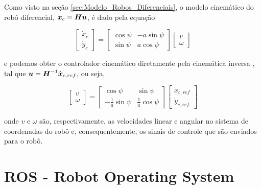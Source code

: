         Como visto na seção \ref{sec:Modelo_Robos_Diferenciais}, o modelo cinemático do robô diferencial, \( \boldsymbol{x}_c = \boldsymbol{H} \boldsymbol{u} \), é dado pela equação
        
        \begin{equation}
            \begin{bmatrix} \dot{x}_c \\ \dot{y}_c  \end{bmatrix} = \begin{bmatrix} \cos{\psi} & -a \sin{\psi} \\ \sin{\psi} & a \cos{\psi}   \end{bmatrix} \begin{bmatrix} v \\ \omega    \end{bmatrix}
            \label{eq:kinematics_differential_limo}
        \end{equation}
        
        e podemos obter o controlador cinemático diretamente pela cinemática inversa \cite{Sarcinelli-Filho2023_4}, tal que $\boldsymbol{u} = \boldsymbol{H}^{-1} \dot{\boldsymbol{x}}_{c,ref}$, ou seja,
        
        \begin{equation}
           \begin{bmatrix} v \\ \omega    \end{bmatrix}
           =  
           \begin{bmatrix} \cos{\psi} & \sin{\psi} \\ -\frac{1}{a}\sin{\psi} & \frac{1}{a} \cos{\psi}   \end{bmatrix} 
           \begin{bmatrix}\dot{x}_{c,ref} \\ \dot{y}_{c,ref}   \end{bmatrix}
           \label{eq:kinematic_controller_differential}
        \end{equation}
        
        onde $v$ e $\omega$ são, respectivamente, as velocidades linear e angular no sistema de coordenadas do robô e, consequentemente, os sinais de controle que são enviados para o robô.
    


\section{ROS - Robot Operating System}
\label{sec:ROS}

